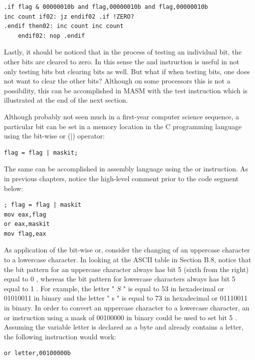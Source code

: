 \documentclass[10pt]{book}
\begin{document}
\begin{verbatim}
.if flag & 00000010b and flag,00000010b and flag,00000010b
inc count if02: jz endif02 .if !ZERO?
.endif then02: inc count inc count
    endif02: nop .endif
\end{verbatim}

Lastly, it should be noticed that in the process of testing an individual bit, the other bits are cleared to zero. In this sense the and instruction is useful in not only testing bits but clearing bits as well. But what if when testing bits, one does not want to clear the other bits? Although on some processors this is not a possibility, this can be accomplished in MASM with the test instruction which is illustrated at the end of the next section.

Although probably not seen much in a first-year computer science sequence, a particular bit can be set in a memory location in the C programming language using the bit-wise or (|) operator:

\begin{verbatim}
flag = flag | maskit;
\end{verbatim}

The same can be accomplished in assembly language using the or instruction. As in previous chapters, notice the high-level comment prior to the code segment below:

\begin{verbatim}
; flag = flag | maskit
mov eax,flag
or eax,maskit
mov flag,eax
\end{verbatim}

As application of the bit-wise or, consider the changing of an uppercase character to a lowercase character. In looking at the ASCII table in Section B.8, notice that the bit pattern for an uppercase character always has bit 5 (sixth from the right) equal to 0 , whereas the bit pattern for lowercase characters always has bit 5 equal to 1 . For example, the letter " $S$ " is equal to 53 in hexadecimal or 01010011 in binary and the letter " s " is equal to 73 in hexadecimal or 01110011 in binary. In order to convert an uppercase character to a lowercase character, an or instruction using a mask of 00100000 in binary could be used to set bit 5 . Assuming the variable letter is declared as a byte and already contains a letter, the following instruction would work:

\begin{verbatim}
or letter,00100000b
\end{verbatim}
\end{document}
